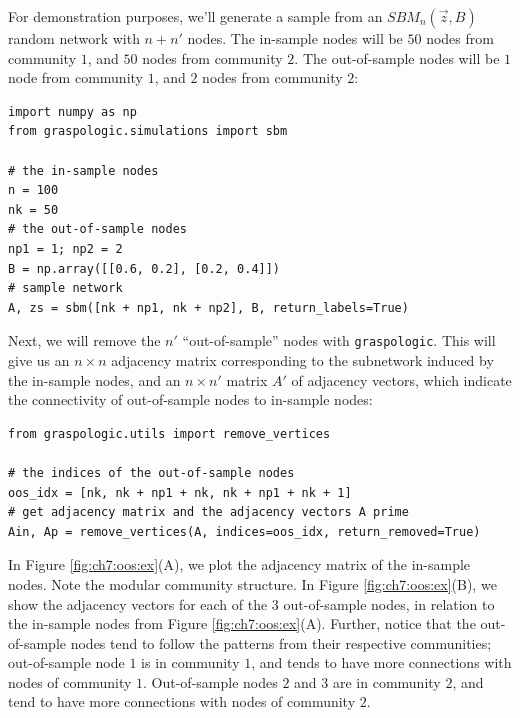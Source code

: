 For demonstration purposes, we'll generate a sample from an $SBM_n(\vec z, B)$ random network with $n + n'$ nodes. The in-sample nodes will be $50$ nodes from community $1$, and $50$ nodes from community $2$. The out-of-sample nodes will be $1$ node from community $1$, and $2$ nodes from community $2$:

\begin{lstlisting}[style=python]
import numpy as np
from graspologic.simulations import sbm

# the in-sample nodes
n = 100
nk = 50
# the out-of-sample nodes
np1 = 1; np2 = 2
B = np.array([[0.6, 0.2], [0.2, 0.4]])
# sample network
A, zs = sbm([nk + np1, nk + np2], B, return_labels=True)
\end{lstlisting}

Next, we will remove the $n'$ ``out-of-sample'' nodes with \texttt{graspologic}. This will give us an $n \times n$ adjacency matrix corresponding to the subnetwork induced by the in-sample nodes, and an $n \times n'$ matrix $A'$ of adjacency vectors, which indicate the connectivity of out-of-sample nodes to in-sample nodes:

\begin{lstlisting}[style=python]
from graspologic.utils import remove_vertices

# the indices of the out-of-sample nodes
oos_idx = [nk, nk + np1 + nk, nk + np1 + nk + 1]
# get adjacency matrix and the adjacency vectors A prime
Ain, Ap = remove_vertices(A, indices=oos_idx, return_removed=True)
\end{lstlisting}

In Figure \ref{fig:ch7:oos:ex}(A), we plot the adjacency matrix of the in-sample nodes. Note the modular community structure. In Figure \ref{fig:ch7:oos:ex}(B), we show the adjacency vectors for each of the $3$ out-of-sample nodes, in relation to the in-sample nodes from Figure \ref{fig:ch7:oos:ex}(A). Further, notice that the out-of-sample nodes tend to follow the patterns from their respective communities; out-of-sample node $1$ is in community $1$, and tends to have more connections with nodes of community $1$. Out-of-sample nodes $2$ and $3$ are in community $2$, and tend to have more connections with nodes of community $2$.

